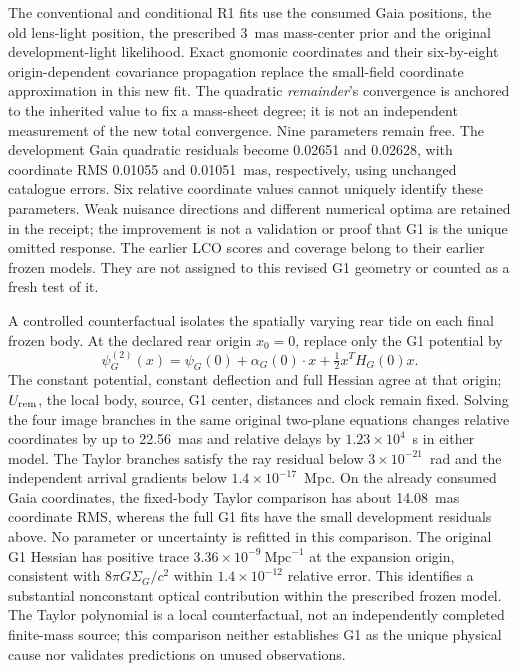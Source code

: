 The conventional and conditional R1 fits use the consumed Gaia positions,
the old lens-light position, the prescribed 3~mas mass-center prior and
the original development-light likelihood. Exact gnomonic coordinates
and their six-by-eight origin-dependent covariance propagation replace
the small-field coordinate approximation in this new fit. The
quadratic \emph{remainder}'s convergence is anchored to the inherited
value to fix a mass-sheet degree; it is not an independent measurement
of the new total convergence. Nine parameters remain free. The
development Gaia quadratic residuals become 0.02651 and 0.02628,
with coordinate RMS 0.01055 and 0.01051~mas, respectively, using
unchanged catalogue errors. Six relative coordinate values cannot uniquely identify
these parameters. Weak nuisance directions and different numerical
optima are retained in the receipt; the improvement is not a validation
or proof that G1 is the unique omitted response.
The earlier LCO scores and coverage belong to their earlier frozen
models. They are not assigned to this revised G1 geometry or counted as
a fresh test of it.

A controlled counterfactual isolates the spatially varying rear tide
on each final frozen body. At the declared rear origin $x_0=0$, replace
only the G1 potential by
\begin{equation}
 \psi_G^{(2)}(x)=\psi_G(0)+\alpha_G(0)\!\cdot x
                  +\tfrac12 x^T H_G(0)x.
 \label{eq:he0435-g1-taylor-counterfactual}
\end{equation}
The constant potential, constant deflection and full Hessian agree
at that origin; $U_{\rm rem}$, the local body, source, G1 center,
distances and clock remain fixed. Solving the four image branches in
the same original two-plane equations changes relative coordinates by
up to 22.56~mas and relative delays by $1.23\times10^4$~s in either
model. The Taylor branches satisfy the ray residual below
$3\times10^{-21}$~rad and the independent arrival gradients below
$1.4\times10^{-17}$~Mpc. On the already consumed Gaia coordinates,
the fixed-body Taylor comparison has about 14.08~mas coordinate RMS,
whereas the full G1 fits have the small development residuals above.
No parameter or uncertainty is refitted in this comparison.
The original G1 Hessian has positive trace
$3.36\times10^{-9}~\mathrm{Mpc}^{-1}$ at the expansion origin,
consistent with $8\pi G\Sigma_G/c^2$ within
$1.4\times10^{-12}$ relative error.
This identifies a substantial nonconstant optical contribution within
the prescribed frozen model. The Taylor polynomial is a local
counterfactual, not an independently completed finite-mass source;
this comparison neither establishes G1 as the unique physical cause
nor validates predictions on unused observations.

